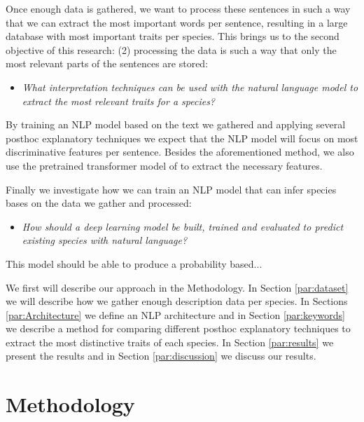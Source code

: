 \documentclass[a4paper, 12pt, oneside]{book} %
\begin{document}
Once enough data is gathered, we want to process these sentences in such a way that we can extract the most important words per sentence, resulting in a large database with most important traits per species.
This brings us to the second objective of this research: (2) processing the data is such a way that only the most relevant parts of the sentences are stored:
\begin{itemize}
    \item \emph{What interpretation techniques can be used with the natural language model to extract the most relevant traits for a species?}
\end{itemize}
By training an NLP model based on the text we gathered and applying several posthoc explanatory techniques we expect that the NLP model will focus on most discriminative features per sentence.
Besides the aforementioned method, we also use the pretrained transformer model of \textcite{wolf_huggingfaces_2020} to extract the necessary features.

Finally we investigate how we can train an NLP model that can infer species bases on the data we gather and processed:
\begin{itemize}
    \item \emph{How should a deep learning model be built, trained and evaluated to predict existing species with natural language?}
\end{itemize}
This model should be able to produce a probability based...


We first will describe our approach in the Methodology.
In Section \ref{par:dataset} we will describe how we gather enough description data per species.
In Sections \ref{par:Architecture} we define an NLP architecture and in Section \ref{par:keywords} we describe a method for comparing different posthoc explanatory techniques to extract the most distinctive traits of each species.
In Section \ref{par:results} we present the results and in Section \ref{par:discussion} we discuss our results.

\newpage
\section{Methodology} \label{par:methodoly}
\end{document}
